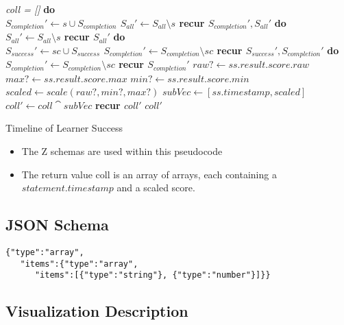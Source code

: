\documentclass{article}
\begin{document}
\begin{algorithm}[H]
  \SetAlgoLined
  \emph{coll = []}\;
  {
    {
      {\bf do \\
        $S_{completion}' \leftarrow s \cup S_{completion}$\;
        $S_{all}' \leftarrow S_{all} \setminus s$ \;
        recur $S_{completion}', S_{all}'$\;}
      {\bf do \\
        $S_{all}' \leftarrow S_{all} \setminus s$\;
        recur $S_{all}'$\;}}}
  {
    {
      {\bf do \\
        $S_{success}' \leftarrow sc \cup S_{success}$\;
        $S_{completion}' \leftarrow S_{completion} \setminus sc$\;
        recur $S_{success}', S_{completion}'$\;}
      {\bf do \\
        $S_{completion}' \leftarrow S_{completion} \setminus sc$\;
        recur $S_{completion}'$\;}}}
  {
    {$raw? \leftarrow ss.result.score.raw$\;
     $max? \leftarrow ss.result.score.max$\;
     $min? \leftarrow ss.result.score.min$\;
     $scaled \leftarrow scale(raw?, min?, max?)$\;
     $subVec \leftarrow [ss.timestamp, scaled]$\;
     $coll' \leftarrow coll \cat subVec$\;
     {\bf recur $coll'$}}
   \Return $coll'$}
  \caption{Timeline of Learner Success}
\end{algorithm}
\begin{itemize}
\item The Z schemas are used within this pseudocode
\item The return value coll is an array of arrays, each containing a
  $statement.timestamp$ and a scaled score.
\end{itemize}

\subsection{JSON Schema}
\begin{lstlisting}[style=json]
{"type":"array",
   "items":{"type":"array",
      "items":[{"type":"string"}, {"type":"number"}]}}
\end{lstlisting}

\subsection{Visualization Description}
\end{document}
